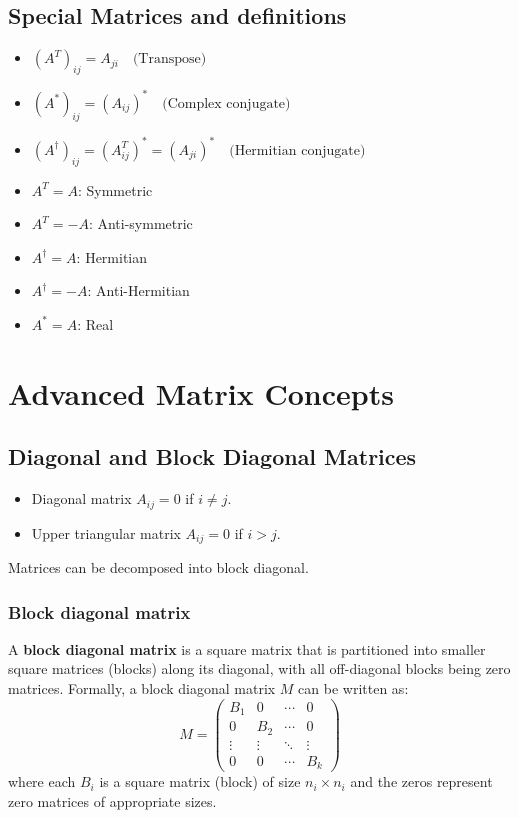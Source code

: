 \documentclass[12pt, a4paper]{report}
\begin{document}
\subsection{Special Matrices and definitions}
\begin{itemize}
    \item $(A^T)_{ij} = A_{ji} \quad \text{(Transpose)}$
    \item $(A^\ast)_{ij} = (A_{ij})^\ast \quad \text{(Complex conjugate)}$
    \item $(A^\dagger)_{ij} = (A^T_{ij})^\ast = (A_{ji})^\ast \quad \text{(Hermitian conjugate)}$
    \item $A^T=A$: Symmetric
    \item $A^T=-A$: Anti-symmetric
    \item $A^\dagger=A$: Hermitian
    \item $A^\dagger=-A$: Anti-Hermitian
    \item $A^\ast=A$: Real
\end{itemize}

\section{Advanced Matrix Concepts}

\subsection{Diagonal and Block Diagonal Matrices}
\begin{itemize}
    \item Diagonal matrix $A_{ij}=0$ if $i \ne j$.
    \item Upper triangular matrix $A_{ij}=0$ if $i>j$.
\end{itemize}
Matrices can be decomposed into block diagonal.

\subsubsection{Block diagonal matrix}
A \textbf{block diagonal matrix} is a square matrix that is partitioned into smaller square matrices (blocks) along its diagonal, with all off-diagonal blocks being zero matrices. Formally, a block diagonal matrix $M$ can be written as:
$$
M = \begin{pmatrix}
B_1 & 0 & \cdots & 0 \\
0 & B_2 & \cdots & 0 \\
\vdots & \vdots & \ddots & \vdots \\
0 & 0 & \cdots & B_k
\end{pmatrix}
$$
where each $B_i$ is a square matrix (block) of size $n_i \times n_i$ and the zeros represent zero matrices of appropriate sizes.
\end{document}

